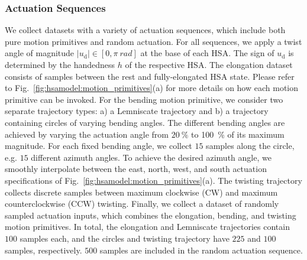 \subsubsection{Actuation Sequences}\label{ssub:hsamodel:hsa_rod_kinematics:actuation_sequences}
We collect datasets with a variety of actuation sequences, which include both pure motion primitives and random actuation. 
For all sequences, we apply a twist angle of magnitude  $|u_\mathrm{d}| \in [0, \pi \: \si{rad}]$ at the base of each \gls{HSA}. The sign of $u_\mathrm{d}$ is determined by the handedness $h$ of the respective \gls{HSA}.
The elongation dataset consists of samples between the rest and fully-elongated \gls{HSA} state. Please refer to Fig.~\ref{fig:hsamodel:motion_primitives}(a) for more details on how each motion primitive can be invoked.
For the bending motion primitive, we consider two separate trajectory types: a) a Lemniscate trajectory and b) a trajectory containing circles of varying bending angles. The different bending angles are achieved by varying the actuation angle from $\SI{20}{\percent}$ to \SI{100}{\percent} of its maximum magnitude. For each fixed bending angle, we collect $15$ samples along the circle, e.g. $15$ different azimuth angles.
To achieve the desired azimuth angle, we smoothly interpolate between the east, north, west, and south actuation specifications of Fig.~\ref{fig:hsamodel:motion_primitives}(a).
The twisting trajectory collects discrete samples between maximum clockwise (CW) and maximum counterclockwise (CCW) twisting.
Finally, we collect a dataset of randomly sampled actuation inputs, which combines the elongation, bending, and twisting motion primitives. %
In total, the elongation and Lemniscate trajectories contain $100$ samples each, and the circles and twisting trajectory have $225$ and $100$ samples, respectively. $500$ samples are included in the random actuation sequence.




